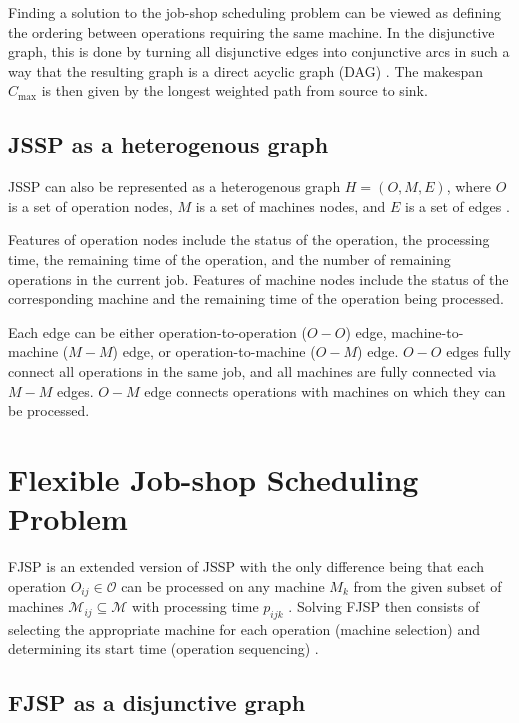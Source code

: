 Finding a solution to the job-shop scheduling problem can be viewed as defining the ordering between operations requiring the same machine. In the disjunctive graph, this is done by turning all disjunctive edges into conjunctive arcs \cite{YamadaNakanoJSSP, BLAZEWICZ2000317} in such a way that the resulting graph is a direct acyclic graph (DAG) \cite{doi:10.1287/opre.17.6.941}. The makespan $C_\text{max}$ is then given by the longest weighted path from source to sink.

\subsection{JSSP as a heterogenous graph} \label{JSSP as a heterogenous graph}

JSSP can also be represented as a heterogenous graph $H = (O, M, E)$, where $O$ is a set of operation nodes, $M$ is a set of machines nodes, and $E$ is a set of edges \cite{10226873}.
\par
Features of operation nodes include the status of the operation, the processing time, the remaining time of the operation, and the number of remaining operations in the current job. Features of machine nodes include the status of the corresponding machine and the remaining time of the operation being processed.
\par
Each edge can be either operation-to-operation ($O-O$) edge, machine-to-machine ($M-M$) edge, or operation-to-machine ($O-M$) edge. $O-O$ edges fully connect all operations in the same job, and all machines are fully connected via $M-M$ edges. $O-M$ edge connects operations with machines on which they can be processed.

\section{Flexible Job-shop Scheduling Problem}

FJSP is an extended version of JSSP with the only difference being that each operation $O_{ij} \in \mathcal{O}$ can be processed on any machine $M_k$ from the given subset of machines $\mathcal{M}_{ij} \subseteq \mathcal{M}$ with processing time $p_{ijk}$ \cite{9826438}. Solving FJSP then consists of selecting the appropriate machine for each operation (machine selection) and determining its start time (operation sequencing) \cite{https://doi.org/10.1049/iet-cim.2018.0009}. 

\subsection{FJSP as a disjunctive graph}

